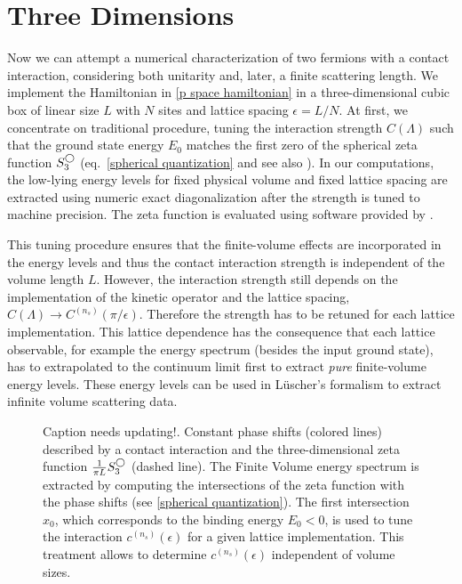 \section{Three Dimensions}\label{sec:3D}

Now we can attempt a numerical characterization of two fermions with a contact interaction, considering both unitarity and, later, a finite scattering length.
We implement the Hamiltonian in \eqref{p space hamiltonian} in a three-dimensional cubic box of linear size $L$ with $N$ sites and lattice spacing $\epsilon=L/N$.
At first, we concentrate on traditional procedure, tuning the interaction strength $C(\Lambda)$ such that the ground state energy $E_0$ matches the first zero of the spherical zeta function $S^{\bigcirc}_3$ (eq.~\eqref{spherical quantization} and see also ).
In our computations, the low-lying energy levels for fixed physical volume and fixed lattice spacing are extracted using numeric exact diagonalization after the strength is tuned to machine precision.
The zeta function is evaluated using software provided by .

This tuning procedure ensures that the finite-volume effects are incorporated in the energy levels and thus the contact interaction strength is independent of the volume length $L$.
However, the interaction strength still depends on the implementation of the kinetic operator and the lattice spacing, $C(\Lambda)\to C^{(n_s)}(\pi/\epsilon)$.
Therefore the strength has to be retuned for each lattice implementation.
This lattice dependence has the consequence that each lattice observable, for example the energy spectrum (besides the input ground state), has to extrapolated to the continuum limit first to extract \textit{pure} finite-volume energy levels.
These energy levels can be used in L\"uscher's formalism to extract infinite volume scattering data.

\begin{figure}
\center
 \scalebox{0.8}{}
\caption{\label{fig:tuning}
    {\color{red} Caption needs updating!}. Constant phase shifts (colored lines) described by a contact interaction and the three-dimensional zeta function $\frac{1}{\pi L} S^{\bigcirc}_3$ (dashed line).
    The Finite Volume energy spectrum is extracted by computing the intersections of the zeta function with the phase shifts (see \eqref{spherical quantization}).
    The first intersection $x_0$, which corresponds to the binding energy $E_0 < 0$, is used to tune the interaction $c^{(n_s)}(\epsilon)$ for a given lattice implementation.
    This treatment allows to determine $c^{(n_s)}(\epsilon)$ independent of volume sizes.
}
\end{figure}

